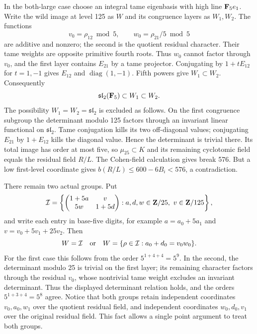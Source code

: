 In the both-large case choose an integral tame eigenbasis with high line $\mathbf F_5e_1$. Write the wild image at level 125 as $W$ and its congruence layers as $W_1,W_2$. The functions
\[
                 v_0=\rho_{12}\bmod5,
          \qquad w_0=\rho_{21}/5\bmod5
\]
are additive and nonzero; the second is the quotient residual character. Their tame weights are opposite primitive fourth roots. Thus $w_0$ cannot factor through $v_0$, and the first layer contains $E_{21}$ by a tame projector. Conjugating by $1+tE_{12}$ for $t=1,-1$ gives $E_{12}$ and $\operatorname{diag}(1,-1)$. Fifth powers give $W_1\subset W_2$. Consequently
\[
                  \mathfrak{sl}_2(\mathbf F_5)\subset W_1\subset W_2.
\]
The possibility $W_1=W_2=\mathfrak{sl}_2$ is excluded as follows. On the first congruence subgroup the determinant modulo 125 factors through an invariant linear functional on $\mathfrak{sl}_2$. Tame conjugation kills its two off-diagonal values; conjugating $E_{21}$ by $1+E_{12}$ kills the diagonal value. Hence the determinant is trivial there. Its total image has order at most five, so $\mu_{25}\subset K$ and its remaining cyclotomic field equals the residual field $R/L$. The Cohen-field calculation gives break 576. But a low first-level coordinate gives $b(R/L)\le600-6B_i<576$, a contradiction.

There remain two actual groups. Put
\[
 \mathcal I=\left\{
 \begin{pmatrix}1+5a&v\\5w&1+5d\end{pmatrix}:
 a,d,w\in\mathbf Z/25,\ v\in\mathbf Z/125\right\},
\]
and write each entry in base-five digits, for example $a=a_0+5a_1$ and $v=v_0+5v_1+25v_2$. Then
\begin{equation}\label{eq:two-iwahori-groups}
 W=\mathcal I\quad\hbox{or}\quad
 W=\{\rho\in\mathcal I:a_0+d_0=v_0w_0\}.
\end{equation}
For the first case this follows from the order $5^{1+4+4}=5^9$. In the second, the determinant modulo 25 is trivial on the first layer; its remaining character factors through the residual $v_0$, whose nontrivial tame weight excludes an invariant determinant. Thus the displayed determinant relation holds, and the orders $5^{1+3+4}=5^8$ agree. Notice that both groups retain independent coordinates $v_0,a_0,w_1$ over the quotient residual field, and independent coordinates $w_0,d_0,v_1$ over the original residual field. This fact allows a single point argument to treat both groups.

